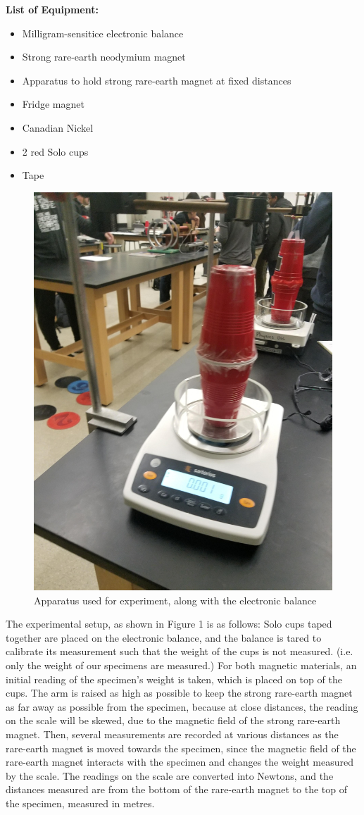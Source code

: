 \documentclass[letterpaper]{article}
\begin{document}


\textbf{List of Equipment:}
\begin{itemize}
 \item Milligram-sensitice electronic balance
 \item Strong rare-earth neodymium magnet
 \item Apparatus to hold strong rare-earth magnet at fixed distances
 \item Fridge magnet
 \item Canadian Nickel
 \item 2 red Solo cups
 \item Tape
\end{itemize}

\begin{figure}[H]
 \centering
 \includegraphics[width=.4\textwidth]{apparatus.jpg}
 \caption{Apparatus used for experiment, along with the electronic balance}
\end{figure}

The experimental setup, as shown in Figure 1 is as follows:
Solo cups taped together are placed on the electronic balance,
and the balance is tared to calibrate its measurement such that
the weight of the cups is not measured. (i.e. only the weight of our
specimens are measured.) For both magnetic materials, an initial reading of the
specimen's weight is taken, which is placed on top of the cups.
The arm is raised as high as possible to keep the strong rare-earth magnet
as far away as possible from the specimen, because at close distances, the reading on the scale
will be skewed, due to the magnetic field of the strong rare-earth magnet.
Then, several measurements are recorded at various distances as the rare-earth magnet is moved towards the
specimen, since the magnetic field of the rare-earth magnet
interacts with the specimen and changes the weight measured by the scale.
The readings on the scale are converted into Newtons, and the distances measured are from the bottom
of the rare-earth magnet to the top of the specimen, measured in metres.
\end{document}
